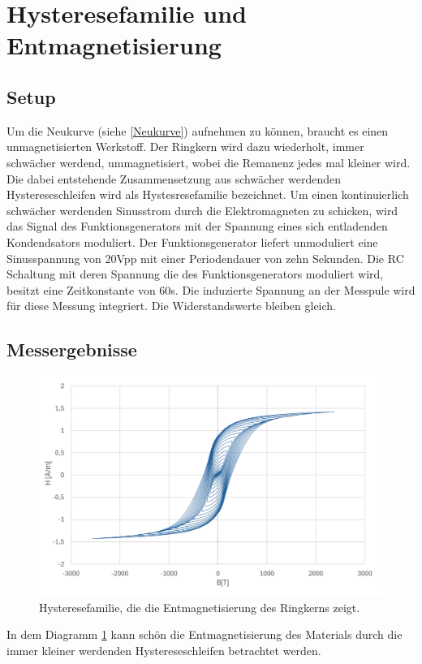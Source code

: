 \documentclass[a4paper,twoside,12pt,DIV=13,BCOR=5mm,numbers=noenddot,cleardoublepage=empty]{scrbook}
\begin{document}
        \section{Hysteresefamilie und Entmagnetisierung}
        \label{Entmag}
        \subsection{Setup}
        Um die Neukurve (siehe \ref{Neukurve}) aufnehmen zu k\"onnen, braucht es einen unmagnetisierten Werkstoff. 
        Der Ringkern wird dazu wiederholt, immer schw\"acher werdend, ummagnetisiert, wobei die Remanenz jedes mal kleiner wird.
        Die dabei entstehende Zusammensetzung aus schw\"acher werdenden Hystereseschleifen wird als Hystesresefamilie bezeichnet. 
        Um einen kontinuierlich schw\"acher werdenden Sinusstrom durch die Elektromagneten zu schicken, wird das Signal des Funktionsgenerators 
        mit der Spannung eines sich entladenden Kondendsators moduliert. Der Funktionsgenerator liefert unmoduliert eine Sinusspannung von 20Vpp mit einer Periodendauer von zehn Sekunden.
        Die RC Schaltung mit deren Spannung die des Funktionsgenerators moduliert wird, besitzt eine Zeitkonstante von 60s. Die induzierte Spannung an der Messpule wird f\"ur diese Messung integriert. 
        Die Widerstandswerte bleiben gleich.
        \subsection{Messergebnisse}
        \begin{figure}
          \centering
          \includegraphics[width=0.9\linewidth]{pictures/Hysteresefamilie.png}
          \caption{Hysteresefamilie, die die Entmagnetisierung des Ringkerns zeigt.}
          \label{fig:entmag}
        \end{figure}
        In dem Diagramm \ref{fig:entmag} kann sch\"on die Entmagnetisierung des Materials durch die immer kleiner werdenden Hystereseschleifen betrachtet werden.
        
\end{document}
